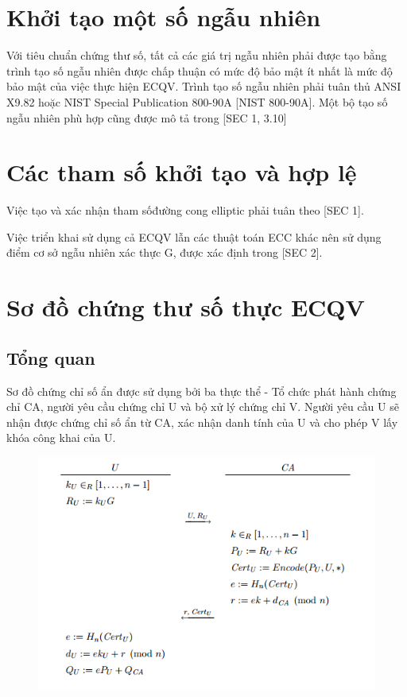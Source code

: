 \documentclass[a4paper,12pt]{report}
\begin{document}
\section{Khởi tạo một số ngẫu nhiên}
Với tiêu chuẩn chứng thư số, tất cả các giá trị ngẫu nhiên phải được tạo bằng trình tạo số ngẫu nhiên được chấp thuận có mức độ bảo mật ít nhất là mức độ bảo mật của việc thực hiện ECQV. Trình tạo số ngẫu nhiên phải tuân thủ ANSI X9.82 hoặc NIST Special Publication 800-90A [NIST 800-90A]. Một bộ tạo số ngẫu nhiên phù hợp cũng được mô tả trong [SEC 1, 3.10]
\section{Các tham số khởi tạo và hợp lệ}
Việc tạo và xác nhận tham sốđường cong elliptic phải tuân theo [SEC 1].

Việc triển khai sử dụng cả ECQV lẫn các thuật toán ECC khác nên sử dụng điểm cơ sở ngẫu nhiên xác thực G, được xác định trong [SEC 2].


\section{Sơ đồ chứng thư số thực ECQV}
\subsection{Tổng quan}
Sơ đồ chứng chỉ số ẩn được sử dụng bởi ba thực thể - Tổ chức phát hành chứng chỉ
CA, người yêu cầu chứng chỉ U và bộ xử lý chứng chỉ V. Người yêu cầu U sẽ nhận được chứng chỉ số ẩn từ CA, xác nhận danh tính của U và cho phép V lấy khóa công khai của U. 
\begin{figure}[h]\label{h3.1}
\begin{center}
\includegraphics[scale=0.9]{../im8.png}
\caption{}
\end{center}
\end{figure}
\end{document}
